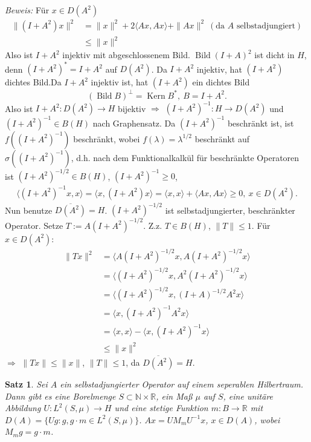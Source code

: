 \documentclass[12pt]{extreport} %
\newtheorem{Satz}{Satz}[subsection]
\DeclareMathOperator{\Kern}{Kern}
\DeclareMathOperator{\Bild}{Bild}
\numberwithin{equation}{section}
\newcommand{\R}{\mathbb{R}} %
\newcommand{\N}{\mathbb{N}} %
\newcommand{\m}{\cdot}
\newcommand{\Bew}{\emph{Beweis: }}
\begin{document}
\Bew Für $x\in D(A^2)$
\begin{align*}
	\|(I+A^2)x\|^2 &= \|x\|^2 + 2\langle Ax,Ax\rangle + \|Ax\|^2 ~(\text{da } A \text{ selbstadjungiert})\\
	&\leq \|x\|^2
\end{align*}
Also ist $I+A^2$ injektiv mit abgeschlossenem Bild. $\Bild(I+A)^2$ ist dicht in $H$, denn $(I+A^2)^* = I+A^2$ auf $D(A^2)$. Da $I+A^2$ injektiv, hat $(I+A^2)$ dichtes Bild.Da $I+A^2$ injektiv ist, hat $(I+A^2)$ ein dichtes Bild 
$$(\Bild B)^\perp = \Kern B^*,~ B = I+A^2.$$
Also ist $I+A^2\colon D(A^2)\rightarrow H$ bijektiv $\Rightarrow$ $(I+A^2)^{-1}\colon H\rightarrow D(A^2)$ und $(I+A^2)^{-1}\in B(H)$ nach Graphensatz. Da $(I+A^2)^{-1}$ beschränkt ist, ist $f((I+A^2)^{-1})$ beschränkt, wobei $f(\lambda) = \lambda^{1/2}$ beschränkt auf $\sigma((I+A^2)^{-1})$, d.h. nach dem Funktionalkalkül für beschränkte Operatoren ist $(I+A^2)^{-1/2}\in B(H)$, $(I+A^2)^{-1}\geq 0$,
\begin{align*}
	 \langle (I+A^2)^{-1}x, x\rangle = \langle x,(I+A^2)x\rangle = \langle x,x\rangle +\langle Ax,Ax\rangle \geq 0, ~x\in D(A^2).
\end{align*}
Nun benutze $\overline{D(A^2)} = H$. $(I+A^2)^{-1/2}$ ist selbstadjungierter, beschränkter Operator. Setze $T:= A(I+A^2)^{-1/2}$. Z.z. $T\in B(H)$, $\|T\|\leq 1$. Für $x\in D(A^2)$:
\begin{align*}
	\|Tx\|^2 &= \langle A(I+A^2)^{-1/2}x, A(I+A^2)^{-1/2}x\rangle \\
	&= \langle (I+A^2)^{-1/2}x, A^2(I+A^2)^{-1/2}x\rangle\\
	&= \langle (I+A^2)^{-1/2} x, (I+A)^{-1/2} A^2 x\rangle \\
	&= \langle x, (I+A^2)^{-1} A^2 x\rangle \\
	&= \langle x,x\rangle - \langle x, (I+A^2)^{-1}x\rangle\\
	&\leq \|x\|^2
\end{align*}
$\Rightarrow$ $\|Tx\| \leq \|x\|$, $\|T\|\leq 1$, da $\overline{D(A^2)} = H$.

\begin{Satz}
	Sei $A$ ein selbstadjungierter Operator auf einem seperablen Hilbertraum. Dann gibt es eine Borelmenge $S\subset \N\times \R$, ein Maß $\mu$ auf $S$, eine unitäre Abbildung $U\colon L^2(S,\mu)\rightarrow H$ und eine stetige Funktion $m\colon B\rightarrow \R$ mit $D(A) = \{Ug\colon g, g\m m\in L^2(S,\mu) \}$. $Ax= U M_m U^{-1}x$, $x\in D(A)$, wobei $M_m g= g\m m$.
\end{Satz}
\end{document}
